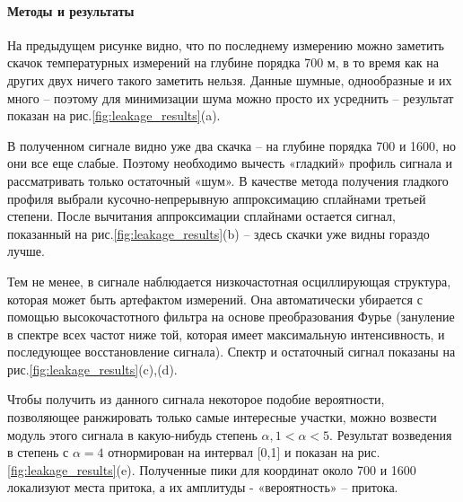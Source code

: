 \paragraph{Методы и результаты}
\par
На предыдущем рисунке видно, что по последнему измерению можно заметить скачок температурных измерений на глубине порядка 700 м, в то время как на других двух ничего такого заметить нельзя. Данные шумные, однообразные и их много – поэтому для минимизации шума можно просто их усреднить – результат показан на рис.\ref{fig:leakage_results}(a).
\par
В полученном сигнале видно уже два скачка – на глубине порядка 700 и 1600, но они все еще слабые. Поэтому необходимо вычесть «гладкий» профиль сигнала и рассматривать только остаточный «шум». В качестве метода получения гладкого профиля выбрали кусочно-непрерывную аппроксимацию сплайнами третьей степени. После вычитания аппроксимации сплайнами остается сигнал, показанный на рис.\ref{fig:leakage_results}(b) – здесь скачки уже видны гораздо лучше.
\par
Тем не менее, в сигнале наблюдается низкочастотная осциллирующая структура, которая может быть артефактом измерений. Она автоматически убирается с помощью высокочастотного фильтра на основе преобразования Фурье (зануление в спектре всех частот ниже той, которая имеет максимальную интенсивность, и последующее восстановление сигнала). Спектр и остаточный сигнал показаны на рис.\ref{fig:leakage_results}(c),(d).
\par
Чтобы получить из данного сигнала некоторое подобие вероятности, позволяющее ранжировать только самые интересные участки, можно возвести модуль этого сигнала в какую-нибудь степень $\alpha, 1<\alpha<5$. Результат возведения в степень с $\alpha=4$ отнормирован на интервал [0,1] и показан на рис.\ref{fig:leakage_results}(e). Полученные пики для координат около 700 и 1600 локализуют места притока, а их амплитуды - «вероятность» – притока.

